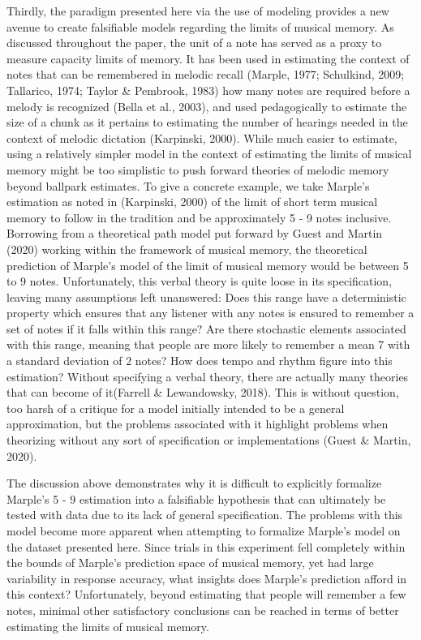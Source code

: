 \documentclass[english,man]{apa6}
\begin{document}
Thirdly, the paradigm presented here via the use of modeling provides a new avenue to create falsifiable models regarding the limits of musical memory.
As discussed throughout the paper, the unit of a note has served as a proxy to measure capacity limits of memory. It has been used in estimating the context of notes that can be remembered in melodic recall (Marple, 1977; Schulkind, 2009; Tallarico, 1974; Taylor \& Pembrook, 1983) how many notes are required before a melody is recognized (Bella et al., 2003), and used pedagogically to estimate the size of a chunk as it pertains to estimating the number of hearings needed in the context of melodic dictation (Karpinski, 2000).
While much easier to estimate, using a relatively simpler model in the context of estimating the limits of musical memory might be too simplistic to push forward theories of melodic memory beyond ballpark estimates.
To give a concrete example, we take Marple's estimation as noted in (Karpinski, 2000) of the limit of short term musical memory to follow in the tradition and be approximately 5 - 9 notes inclusive.
Borrowing from a theoretical path model put forward by Guest and Martin (2020) working within the framework of musical memory, the theoretical prediction of Marple's model of the limit of musical memory would be between 5 to 9 notes.
Unfortunately, this verbal theory is quite loose in its specification, leaving many assumptions left unanswered:
Does this range have a deterministic property which ensures that any listener with any notes is ensured to remember a set of notes if it falls within this range?
Are there stochastic elements associated with this range, meaning that people are more likely to remember a mean 7 with a standard deviation of 2 notes?
How does tempo and rhythm figure into this estimation?
Without specifying a verbal theory, there are actually many theories that can become of it(Farrell \& Lewandowsky, 2018).
This is without question, too harsh of a critique for a model initially intended to be a general approximation, but the problems associated with it highlight problems when theorizing without any sort of specification or implementations (Guest \& Martin, 2020).

The discussion above demonstrates why it is difficult to explicitly formalize Marple's 5 - 9 estimation into a falsifiable hypothesis that can ultimately be tested with data due to its lack of general specification.
The problems with this model become more apparent when attempting to formalize Marple's model on the dataset presented here.
Since trials in this experiment fell completely within the bounds of Marple's prediction space of musical memory, yet had large variability in response accuracy, what insights does Marple's prediction afford in this context?
Unfortunately, beyond estimating that people will remember a few notes, minimal other satisfactory conclusions can be reached in terms of better estimating the limits of musical memory.
\end{document}
